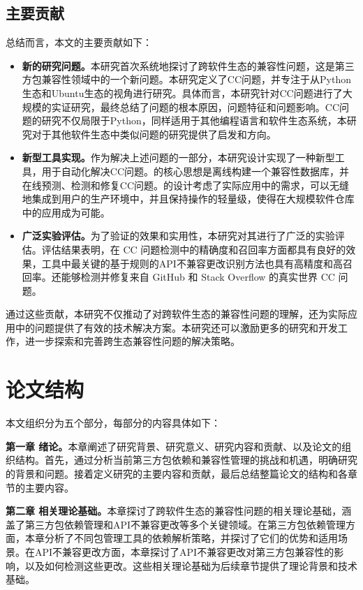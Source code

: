 \subsection{主要贡献}
总结而言，本文的主要贡献如下： 
\begin{itemize}
	\item \textbf{新的研究问题。}本研究首次系统地探讨了跨软件生态的兼容性问题，这是第三方包兼容性领域中的一个新问题。本研究定义了CC问题，并专注于从Python生态和Ubuntu生态的视角进行研究。具体而言，本研究针对CC问题进行了大规模的实证研究，最终总结了问题的根本原因，问题特征和问题影响。CC问题的研究不仅局限于Python，同样适用于其他编程语言和软件生态系统，本研究对于其他软件生态中类似问题的研究提供了启发和方向。
	\item \textbf{新型工具实现。}作为解决上述问题的一部分，本研究设计实现了一种新型工具\tool{}，用于自动化解决CC问题。\tool{}的核心思想是离线构建一个兼容性数据库，并在线预测、检测和修复CC问题。\tool{}的设计考虑了实际应用中的需求，可以无缝地集成到用户的生产环境中，并且保持操作的轻量级，使得在大规模软件仓库中的应用成为可能。
	\item \textbf{广泛实验评估。}为了验证\tool{}的效果和实用性，本研究对其进行了广泛的实验评估。评估结果表明，\tool{}在 CC 问题检测中的精确度和召回率方面都具有良好的效果，工具中最关键的基于规则的API不兼容更改识别方法也具有高精度和高召回率。\tool{}还能够检测并修复来自 GitHub 和 Stack Overflow 的真实世界 CC 问题。
\end{itemize}
通过这些贡献，本研究不仅推动了对跨软件生态的兼容性问题的理解，还为实际应用中的问题提供了有效的技术解决方案。本研究还可以激励更多的研究和开发工作，进一步探索和完善跨生态兼容性问题的解决策略。

\section{论文结构}
本文组织分为五个部分，每部分的内容具体如下：

\textbf{第一章 绪论。}本章阐述了研究背景、研究意义、研究内容和贡献、以及论文的组织结构。首先，通过分析当前第三方包依赖和兼容性管理的挑战和机遇，明确研究的背景和问题。接着定义研究的主要内容和贡献，最后总结整篇论文的结构和各章节的主要内容。

\textbf{第二章 相关理论基础。}本章探讨了跨软件生态的兼容性问题的相关理论基础，涵盖了第三方包依赖管理和API不兼容更改等多个关键领域。在第三方包依赖管理方面，本章分析了不同包管理工具的依赖解析策略，并探讨了它们的优势和适用场景。在API不兼容更改方面，本章探讨了API不兼容更改对第三方包兼容性的影响，以及如何检测这些更改。这些相关理论基础为后续章节提供了理论背景和技术基础。

